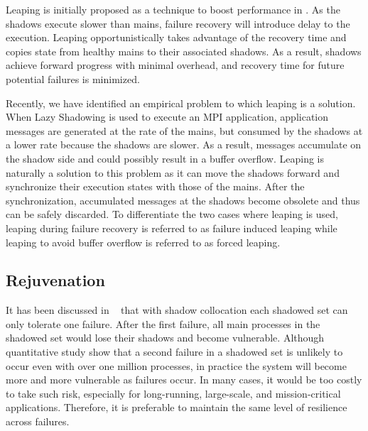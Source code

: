 Leaping is initially proposed as a technique to boost performance in \cite{cui_2016_scalcom}. As the shadows execute slower than mains, failure recovery will introduce delay to the execution. Leaping opportunistically takes advantage of the recovery time and copies state from healthy mains to their associated shadows. As a result, shadows achieve forward progress with minimal overhead, and recovery time for future potential failures is minimized.

Recently, we have identified an empirical problem to which leaping is a solution. When Lazy Shadowing is used to execute an MPI application, application messages are generated at the rate of the mains, but consumed by the shadows at a lower rate because the shadows are slower. As a result, messages accumulate on the shadow side and could possibly result in a buffer overflow. Leaping is naturally a solution to this problem as it can move the shadows forward and synchronize their execution states with those of the mains. After the synchronization, accumulated messages at the shadows become obsolete and thus can be safely discarded. To differentiate the two cases where leaping is used, leaping during failure recovery is referred to as failure induced leaping while leaping to avoid buffer overflow is referred to as forced leaping. 

\subsection{Rejuvenation}

It has been discussed in ~\cite{cui_2016_scalcom} that with shadow collocation each shadowed set can only tolerate one failure. After the first failure, all main processes in the shadowed set would lose their shadows and become vulnerable. Although quantitative study show that a second failure in a shadowed set is unlikely to occur even with over one million processes, in practice the system will become more and more vulnerable as failures occur. In many cases, it would be too costly to take such risk, especially for long-running, large-scale, and mission-critical applications. Therefore, it is preferable to maintain the same level of resilience across failures.


